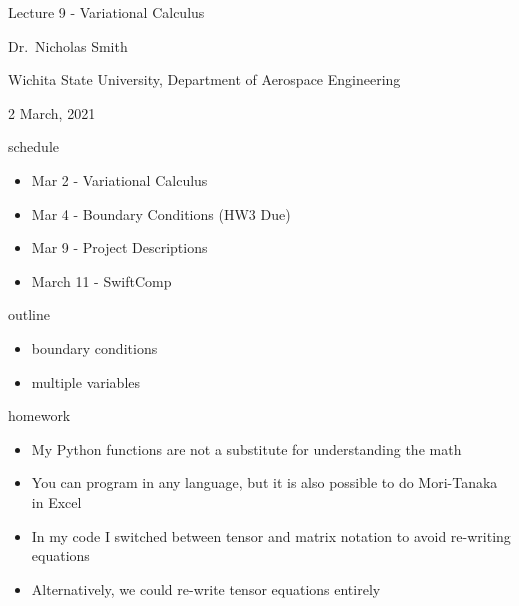 \documentclass[
  letterpaper,
  ignorenonframetext,
  aspectratio=43,
  handout,
  12pt]{beamer}
\author{}
\date{}
\providecommand{\tightlist}{%
  \setlength{\itemsep}{0pt}\setlength{\parskip}{0pt}}
\providecommand{\tightlist}{%
\setlength{\itemsep}{0pt}\setlength{\parskip}{0pt}}
\begin{document}
\begin{frame}
Lecture 9 - Variational Calculus

Dr.~Nicholas Smith

Wichita State University, Department of Aerospace Engineering

2 March, 2021
\end{frame}

\begin{frame}{schedule}
\protect\hypertarget{schedule}{}
\begin{itemize}
\tightlist
\item
  Mar 2 - Variational Calculus
\item
  Mar 4 - Boundary Conditions (HW3 Due)
\item
  Mar 9 - Project Descriptions
\item
  March 11 - SwiftComp
\end{itemize}
\end{frame}

\begin{frame}{outline}
\protect\hypertarget{outline}{}
\begin{itemize}
\tightlist
\item
  boundary conditions
\item
  multiple variables
\end{itemize}
\end{frame}

\begin{frame}{homework}
\protect\hypertarget{homework}{}
\begin{itemize}
\tightlist
\item
  My Python functions are not a substitute for understanding the math
\item
  You can program in any language, but it is also possible to do
  Mori-Tanaka in Excel
\item
  In my code I switched between tensor and matrix notation to avoid
  re-writing equations
\item
  Alternatively, we could re-write tensor equations entirely
\end{itemize}
\end{frame}
\end{document}
